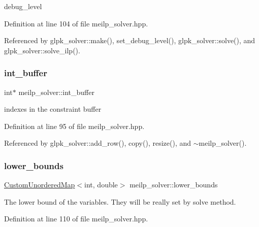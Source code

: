 debug\+\_\+level 



Definition at line 104 of file meilp\+\_\+solver.\+hpp.



Referenced by glpk\+\_\+solver\+::make(), set\+\_\+debug\+\_\+level(), glpk\+\_\+solver\+::solve(), and glpk\+\_\+solver\+::solve\+\_\+ilp().

\mbox{\label{classmeilp__solver_a3a2c69fb4724141d6af37b718bc89275}} 
\subsubsection{\texorpdfstring{int\+\_\+buffer}{int\_buffer}}
{\footnotesize\ttfamily int$\ast$ meilp\+\_\+solver\+::int\+\_\+buffer\hspace{0.3cm}{\ttfamily [protected]}}



indexes in the constraint buffer 



Definition at line 95 of file meilp\+\_\+solver.\+hpp.



Referenced by glpk\+\_\+solver\+::add\+\_\+row(), copy(), resize(), and $\sim$meilp\+\_\+solver().

\mbox{\label{classmeilp__solver_ab8b85ba238c96c08cf614258c98dc2c5}} 
\subsubsection{\texorpdfstring{lower\+\_\+bounds}{lower\_bounds}}
{\footnotesize\ttfamily \hyperlink{custom__map_8hpp_ad1ed68f2ff093683ab1a33522b144adc}{Custom\+Unordered\+Map}$<$int, double$>$ meilp\+\_\+solver\+::lower\+\_\+bounds\hspace{0.3cm}{\ttfamily [protected]}}



The lower bound of the variables. They will be really set by solve method. 



Definition at line 110 of file meilp\+\_\+solver.\+hpp.



